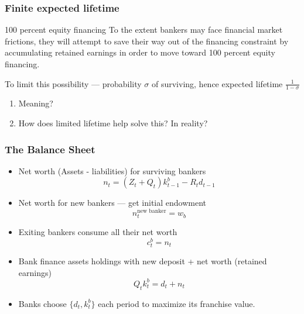 \begin{frame}
    \frametitle{Finite expected lifetime}
    \begin{exampleblock}{100 percent equity financing}
        To the extent bankers may face financial market frictions, 
        they will attempt to save their way out of the financing constraint by
        accumulating retained earnings in order to move toward 100 percent equity financing.  
    \end{exampleblock}

    To limit this possibility --- probability $\sigma$ of surviving, 
    hence expected lifetime $\frac{1}{1-\sigma}$ 
    \begin{enumerate}
        \item Meaning?
        \item How does limited lifetime help solve this? In reality? 
    \end{enumerate}
    
\end{frame}

\begin{frame}
    \frametitle{The Balance Sheet}

    \begin{itemize}
        \item Net worth (Assets - liabilities) for surviving bankers
        \begin{equation}
            n_t = (Z_t + Q_t) k^b_{t-1} - R_{t}d_{t-1}
        \end{equation}
        \item Net worth for new bankers --- get initial endowment
        \begin{equation}
            n_t^\text{new banker} = w_b
        \end{equation}
        \item Exiting bankers consume all their net worth 
        \begin{equation}
            c^b_t = n_t
        \end{equation}
        \item Bank finance assets holdings with new deposit + net worth (retained earnings)
        \begin{equation}
            Q_t k^b_t = d_t + n_t
        \end{equation}
        \item Banks choose $\{d_t, k^b_t\}$ each period to maximize its franchise value.
    \end{itemize}

\end{frame}

